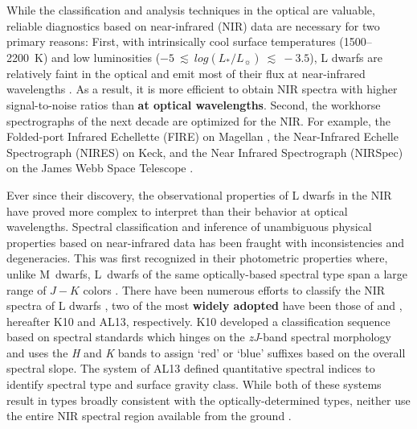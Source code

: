 \documentclass[12pt]{aastex6}
\begin{document}
While the classification and analysis techniques in the optical are valuable, reliable diagnostics based on near-infrared (NIR) data are necessary for two primary reasons:
First, with intrinsically cool surface temperatures (1500--2200~K) and low luminosities ($-5~\lesssim~log(L_*/L_\sun)~\lesssim~-3.5$), L dwarfs are relatively faint in the optical and emit most of their flux at near-infrared wavelengths \citep[e.g.,][]{Filippazzo:2015dv}.
As a result, it is more efficient to obtain NIR spectra with higher signal-to-noise ratios than \textbf{at optical wavelengths}.
Second, the workhorse spectrographs of the next decade are optimized for the NIR. For example, the Folded-port Infrared Echellette (FIRE) on Magellan \citep{Simcoe:2013kh}, the Near-Infrared Echelle Spectrograph (NIRES) on Keck, and the Near Infrared Spectrograph (NIRSpec) on the James Webb Space Telescope \citep{Ferruit:2012em}.

Ever since their discovery, the observational properties of L dwarfs in the NIR have proved more complex to interpret than their behavior at optical wavelengths.
Spectral classification and inference of unambiguous physical properties based on near-infrared data has been fraught with inconsistencies and degeneracies.
This was first recognized in their photometric properties where, unlike M~dwarfs, L~dwarfs of the same optically-based spectral type span a large range of $J-K$ colors \citep[e.g.,][]{Leggett:2003tm}.
There have been numerous efforts to classify the NIR spectra of L dwarfs \citep{Reid01_NIR, Testi01, Geballe02,Burgasser07_subdwarfs}, two of the most \textbf {widely adopted} have been those of \citet{Kirkpatrick10} and \citet{Allers:2013hk}, hereafter K10 and AL13, respectively.
K10 developed a classification sequence based on spectral standards which hinges on the \emph{zJ}-band spectral morphology and uses the \emph{H} and \emph{K} bands to assign `red' or `blue' suffixes based on the overall spectral slope.
The system of AL13 defined quantitative spectral indices to identify spectral type and surface gravity class.
While both of these systems result in types broadly consistent with the optically-determined types, neither use the entire NIR spectral region available from the ground \citep{Kirkpatrick05}.
\end{document}
